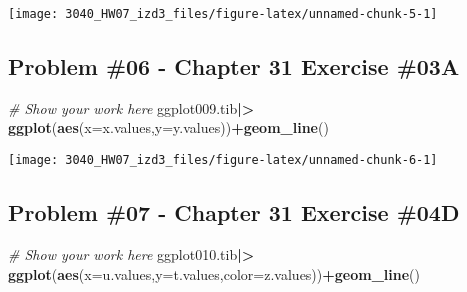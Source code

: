 \documentclass[
]{article}
\newenvironment{Shaded}{\begin{snugshade}}{\end{snugshade}}
\newcommand{\AttributeTok}[1]{\textcolor[rgb]{0.13,0.29,0.53}{#1}}
\newcommand{\CommentTok}[1]{\textcolor[rgb]{0.56,0.35,0.01}{\textit{#1}}}
\newcommand{\DecValTok}[1]{\textcolor[rgb]{0.00,0.00,0.81}{#1}}
\newcommand{\FloatTok}[1]{\textcolor[rgb]{0.00,0.00,0.81}{#1}}
\newcommand{\FunctionTok}[1]{\textcolor[rgb]{0.13,0.29,0.53}{\textbf{#1}}}
\newcommand{\NormalTok}[1]{#1}
\newcommand{\SpecialCharTok}[1]{\textcolor[rgb]{0.81,0.36,0.00}{\textbf{#1}}}
\begin{document}
\begin{Shaded}
\end{Shaded}

\texttt{[image: 3040\_HW07\_izd3\_files/figure-latex/unnamed-chunk-5-1]}

\newpage

\hypertarget{problem-06---chapter-31-exercise-03a}{%
\subsection{Problem \#06 - Chapter 31 Exercise
\#03A}\label{problem-06---chapter-31-exercise-03a}}

\begin{Shaded}
\begin{Highlighting}[]
\CommentTok{\# Show your work here}
\NormalTok{ggplot009.tib}\SpecialCharTok{|\textgreater{}}
  \FunctionTok{ggplot}\NormalTok{(}\FunctionTok{aes}\NormalTok{(}\AttributeTok{x=}\NormalTok{x.values,}\AttributeTok{y=}\NormalTok{y.values))}\SpecialCharTok{+}\FunctionTok{geom\_line}\NormalTok{()}
\end{Highlighting}
\end{Shaded}

\texttt{[image: 3040\_HW07\_izd3\_files/figure-latex/unnamed-chunk-6-1]}

\newpage

\hypertarget{problem-07---chapter-31-exercise-04d}{%
\subsection{Problem \#07 - Chapter 31 Exercise
\#04D}\label{problem-07---chapter-31-exercise-04d}}

\begin{Shaded}
\begin{Highlighting}[]
\CommentTok{\# Show your work here}
\NormalTok{ggplot010.tib}\SpecialCharTok{|\textgreater{}}
  \FunctionTok{ggplot}\NormalTok{(}\FunctionTok{aes}\NormalTok{(}\AttributeTok{x=}\NormalTok{u.values,}\AttributeTok{y=}\NormalTok{t.values,}\AttributeTok{color=}\NormalTok{z.values))}\SpecialCharTok{+}\FunctionTok{geom\_line}\NormalTok{()}
\end{Highlighting}
\end{Shaded}
\end{document}

